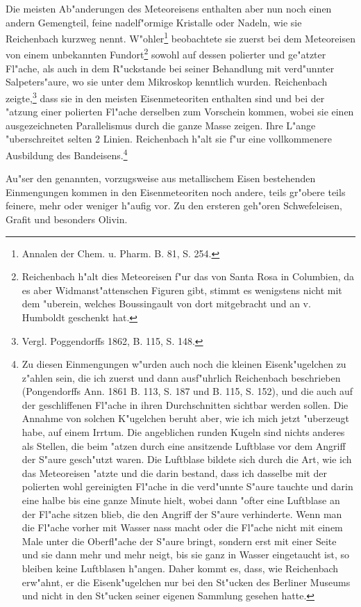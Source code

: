 \documentclass[a4paper, 11pt, oneside, german]{article}
\begin{document}
Die meisten Ab"anderungen des Meteoreisens enthalten aber nun noch einen andern Gemengteil, feine nadelf"ormige Kristalle oder Nadeln, wie sie Reichenbach kurzweg nennt. W"ohler\footnote{Annalen der Chem. u. Pharm. B. 81, S. 254.} beobachtete sie zuerst bei dem Meteoreisen von einem unbekannten Fundort\footnote{Reichenbach h"alt dies Meteoreisen f"ur das von Santa Rosa in Columbien, da es aber Widmanst"attenschen Figuren gibt, stimmt es wenigstens nicht mit dem "uberein, welches Boussingault von dort mitgebracht und an v. Humboldt geschenkt hat.} sowohl auf dessen polierter und ge"atzter Fl"ache, als auch in dem R"uckstande bei seiner Behandlung mit verd"unnter Salpeters"aure, wo sie unter dem Mikroskop kenntlich wurden. Reichenbach zeigte,\footnote{Vergl. Poggendorffs 1862, B. 115, S. 148.} dass sie in den meisten Eisenmeteoriten enthalten sind und bei der "atzung einer polierten Fl"ache derselben zum Vorschein kommen, wobei sie einen ausgezeichneten Parallelismus durch die ganze Masse zeigen. Ihre L"ange "uberschreitet selten 2 Linien. Reichenbach h"alt sie f"ur eine vollkommenere Ausbildung des Bandeisens.\footnote{Zu diesen Einmengungen w"urden auch noch die kleinen Eisenk"ugelchen zu z"ahlen sein, die ich zuerst und dann ausf"uhrlich Reichenbach beschrieben (Pongendorffs Ann. 1861 B. 113, S. 187 und B. 115, S. 152), und die auch auf der geschliffenen Fl"ache in ihren Durchschnitten sichtbar werden sollen. Die Annahme von solchen K"ugelchen beruht aber, wie ich mich jetzt "uberzeugt habe, auf einem Irrtum. Die angeblichen runden Kugeln sind nichts anderes als Stellen, die beim "atzen durch eine ansitzende Luftblase vor dem Angriff der S"aure gesch"utzt waren. Die Luftblase bildete sich durch die Art, wie ich das Meteoreisen "atzte und die darin bestand, dass ich dasselbe mit der polierten wohl gereinigten Fl"ache in die verd"unnte S"aure tauchte und darin eine halbe bis eine ganze Minute hielt, wobei dann "ofter eine Luftblase an der Fl"ache sitzen blieb, die den Angriff der S"aure verhinderte. Wenn man die Fl"ache vorher mit Wasser nass macht oder die Fl"ache nicht mit einem Male unter die Oberfl"ache der S"aure bringt, sondern erst mit einer Seite und sie dann mehr und mehr neigt, bis sie ganz in Wasser eingetaucht ist, so bleiben keine Luftblasen h"angen. Daher kommt es, dass, wie Reichenbach erw"ahnt, er die Eisenk"ugelchen nur bei den St"ucken des Berliner Museums und nicht in den St"ucken seiner eigenen Sammlung gesehen hatte.}

Au"ser den genannten, vorzugsweise aus metallischem Eisen bestehenden Einmengungen kommen in den Eisenmeteoriten noch andere, teils gr"obere teils feinere, mehr oder weniger h"aufig vor. Zu den ersteren geh"oren Schwefeleisen, Grafit und besonders Olivin.
\end{document}
